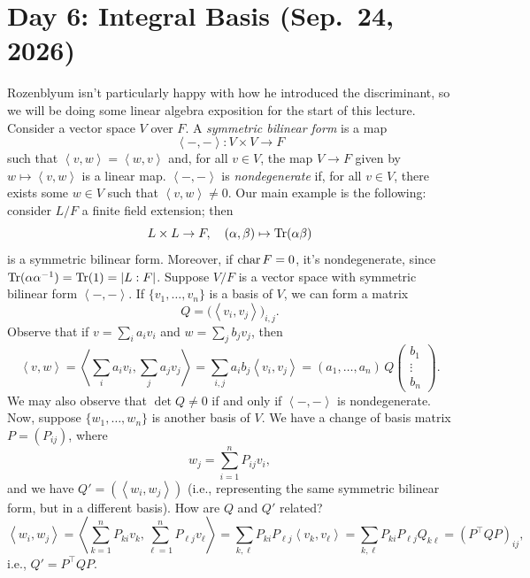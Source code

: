 \section{Day 6: Integral Basis (Sep.\ 24, 2026)}
Rozenblyum isn't particularly happy with how he introduced the discriminant, so we will be doing some linear algebra exposition for the start of this lecture. Consider a vector space $V$ over $F$. A \textit{symmetric bilinear form} is a map
\[ \left<-, -\right> \colon V \times V \to F \]
such that $\left<v, w\right> = \left<w, v\right>$ and, for all $v \in V$, the map $V \to F$ given by $w \mapsto \left<v, w\right>$ is a linear map. $\left<-,-\right>$ is \textit{nondegenerate} if, for all $v \in V$, there exists some $w \in V$ such that $\left<v, w\right> \neq 0$. Our main example is the following: consider $L/F$ a finite field extension; then
\[ L \times L \to F, \quad (\alpha, \beta) \mapsto \operatorname{Tr}(\alpha \beta) \]
is a symmetric bilinear form. Moreover, if $\operatorname{char} F = 0$, it's nondegenerate, since $\operatorname{Tr}(\alpha \alpha^{-1}) = \operatorname{Tr}(1) = \left\lvert L : F \right\rvert$. Suppose $V/F$ is a vector space with symmetric bilinear form $\left<-,-\right>$. If $\{v_1, \dots, v_n\}$ is a basis of $V$, we can form a matrix
\[ Q = \bigl(\left<v_i,v_j\right>\bigr)_{i,j}. \]
Observe that if $v = \sum_i a_i v_i$ and $w = \sum_j b_j v_j$, then
\[ \left<v, w\right> = \left<\sum_i a_i v_i, \sum_j a_j v_j\right> = \sum_{i,j} a_i b_j \left<v_i, v_j\right> = (a_1, \dots, a_n) \, Q \begin{pmatrix} b_1 \\ \vdots \\ b_n \end{pmatrix}. \]
We may also observe that $\det Q \neq 0$ if and only if $\left<-,-\right>$ is nondegenerate. Now, suppose $\{w_1, \dots, w_n\}$ is another basis of $V$. We have a change of basis matrix $P = (P_{ij})$, where
\[ w_j = \sum_{i=1}^n P_{ij} v_i, \]
and we have $Q' = (\left<w_i, w_j\right>)$ (i.e., representing the same symmetric bilinear form, but in a different basis). How are $Q$ and $Q'$ related?
\[ \left<w_i, w_j\right> = \left<\sum_{k=1}^n P_{ki} v_k, \sum_{\ell=1}^n P_{\ell j} v_\ell\right> = \sum_{k,\ell} P_{ki} P_{\ell j} \left<v_k, v_\ell\right> = \sum_{k,\ell} P_{ki} P_{\ell j} Q_{k\ell} = (P^\top Q P)_{ij}, \]
i.e., $Q' = P^\top Q P$.


